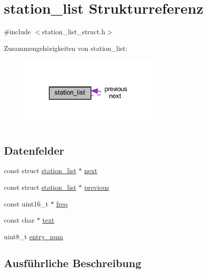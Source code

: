 \hypertarget{structstation__list}{}\section{station\+\_\+list Strukturreferenz}
\label{structstation__list}


{\ttfamily \#include $<$station\+\_\+list\+\_\+struct.\+h$>$}



Zusammengehörigkeiten von station\+\_\+list\+:\nopagebreak
\begin{figure}[H]
\begin{center}
\leavevmode
\includegraphics[width=201pt]{structstation__list__coll__graph}
\end{center}
\end{figure}
\subsection*{Datenfelder}
\begin{DoxyCompactItemize}
\item 
const struct \hyperlink{structstation__list}{station\+\_\+list} $\ast$ \hyperlink{structstation__list_aaf7e88858b6e1e91f04c50ce118be602}{next}
\item 
const struct \hyperlink{structstation__list}{station\+\_\+list} $\ast$ \hyperlink{structstation__list_ae039c5ce88254ad89cea9170a5f3b740}{previous}
\item 
const uint16\+\_\+t $\ast$ \hyperlink{structstation__list_a0c8c7380b4e3197fe0b821b4a6dfbec9}{freq}
\item 
const char $\ast$ \hyperlink{structstation__list_a16343090e80c4472521560f30113d96c}{text}
\item 
uint8\+\_\+t \hyperlink{structstation__list_aab8c201217e885e0ee4e61820a289c0c}{entry\+\_\+num}
\end{DoxyCompactItemize}


\subsection{Ausführliche Beschreibung}



